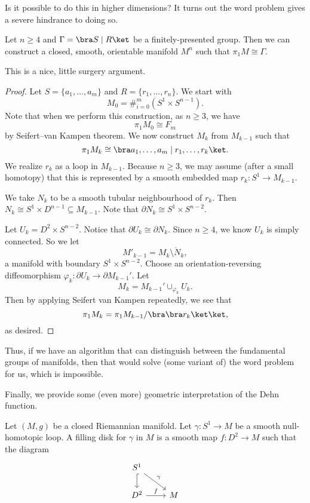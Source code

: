 \documentclass[a4paper]{article}
\begin{document}
Is it possible to do this in higher dimensions? It turns out the word problem gives a severe hindrance to doing so.
\begin{thm}
  Let $n \geq 4$ and $\Gamma = \bra S \mid R\ket$ be a finitely-presented group. Then we can construct a closed, smooth, orientable manifold $M^n$ such that $\pi_1 M \cong \Gamma$.
\end{thm}
This is a nice, little surgery argument.

\begin{proof}
  Let $S = \{a_1, \ldots, a_m\}$ and $R = \{r_1, \ldots, r_n\}$. We start with
  \[
    M_0 = \#_{i = 0}^m (S^1 \times S^{n - 1}).
  \]
  Note that when we perform this construction, as $n \geq 3$, we have
  \[
    \pi_1M_0 \cong F_m
  \]
  by Seifert--van Kampen theorem. We now construct $M_k$ from $M_{k - 1}$ such that
  \[
    \pi_1 M_k \cong \bra a_1, \ldots, a_m \mid r_1, \ldots, r_k\ket.
  \]
  We realize $r_k$ as a loop in $M_{k - 1}$. Because $n \geq 3$, we may assume (after a small homotopy) that this is represented by a smooth embedded map $r_k: S^1 \to M_{k - 1}$.

  We take $N_k$ to be a smooth tubular neighbourhood of $r_k$. Then $N_k \cong S^1 \times D^{n - 1} \subseteq M_{k - 1}$. Note that $\partial N_k \cong S^1 \times S^{n - 2}$.

  Let $U_k = D^2 \times S^{n - 2}$. Notice that $\partial U_k \cong \partial N_k$. Since $n \geq 4$, we know $U_k$ is simply connected. So we let
  \[
    M'_{k - 1} = M_k \setminus \mathring{N}_k,
  \]
  a manifold with boundary $S^1 \times S^{n - 2}$. Choose an orientation-reversing diffeomorphism $\varphi_k: \partial U_k \to \partial M_{k - 1}'$. Let
  \[
    M_k = M_{k - 1}' \cup_{\varphi_k} U_k.
  \]
  Then by applying Seifert van Kampen repeatedly, we see that
  \[
    \pi_1 M_k = \pi_1 M_{k - 1} / \bra \bra r_k \ket \ket,
  \]
  as desired.
\end{proof}
Thus, if we have an algorithm that can distinguish between the fundamental groups of manifolds, then that would solve (some variant of) the word problem for us, which is impossible.

Finally, we provide some (even more) geometric interpretation of the Dehn function.

\begin{defi}
  Let $(M, g)$ be a closed Riemannian manifold. Let $\gamma: S^1 \to M$ be a smooth null-homotopic loop. A filling disk for $\gamma$ in $M$ is a smooth map $f: D^2 \to M$ such that the diagram
  \[
    \begin{tikzcd}
      S^1 \ar[d, hook] \ar[rd, "\gamma"] \\
      D^2 \ar[r, "f"] & M
    \end{tikzcd}
  \]
\end{defi}
\end{document}
